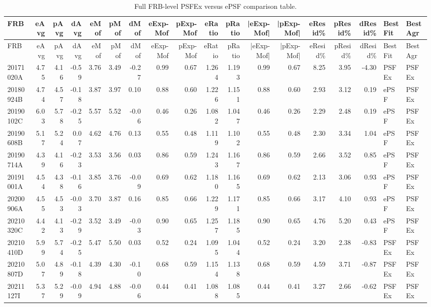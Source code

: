 \begin{longtable}{lrrrrrrrrrrrrrrrll}
\caption{Full FRB-level PSFEx versus ePSF comparison table.}\label{tab:psfex_all_frbs} \\
\hline
 FRB & eAvg & pAvg & dAvg & eMof & pMof & dMof & eExp-Mof & pExp-Mof & eRatio & pRatio & |eExp-Mof| & |pExp-Mof| & eResid\% & pResid\% & dResid\% & BestFit & BestAgr \\
\hline
\endfirsthead
\hline
 FRB & eAvg & pAvg & dAvg & eMof & pMof & dMof & eExp-Mof & pExp-Mof & eRatio & pRatio & |eExp-Mof| & |pExp-Mof| & eResid\% & pResid\% & dResid\% & BestFit & BestAgr \\
\hline
\endhead
 20171020A & 4.75 & 4.16 & -0.59 & 3.76 & 3.49 & -0.27 & 0.99 & 0.67 & 1.264 & 1.193 & 0.99 & 0.67 & 8.25 & 3.95 & -4.30 & PSFEx & PSFEx \\
 20180924B & 4.74 & 4.57 & -0.18 & 3.87 & 3.97 & 0.10 & 0.88 & 0.60 & 1.226 & 1.151 & 0.88 & 0.60 & 2.93 & 3.12 & 0.19 & ePSF & PSFEx \\
 20190102C & 6.03 & 5.78 & -0.25 & 5.57 & 5.52 & -0.06 & 0.46 & 0.26 & 1.082 & 1.047 & 0.46 & 0.26 & 2.29 & 2.48 & 0.19 & ePSF & PSFEx \\
 20190608B & 5.17 & 5.24 & 0.07 & 4.62 & 4.76 & 0.13 & 0.55 & 0.48 & 1.119 & 1.102 & 0.55 & 0.48 & 2.30 & 3.34 & 1.04 & ePSF & PSFEx \\
 20190714A & 4.39 & 4.16 & -0.23 & 3.53 & 3.56 & 0.03 & 0.86 & 0.59 & 1.243 & 1.167 & 0.86 & 0.59 & 2.66 & 3.52 & 0.85 & ePSF & PSFEx \\
 20191001A & 4.54 & 4.38 & -0.16 & 3.85 & 3.76 & -0.09 & 0.69 & 0.62 & 1.180 & 1.165 & 0.69 & 0.62 & 2.13 & 3.06 & 0.93 & ePSF & PSFEx \\
 20200906A & 4.55 & 4.53 & -0.03 & 3.70 & 3.87 & 0.16 & 0.85 & 0.66 & 1.229 & 1.171 & 0.85 & 0.66 & 3.17 & 4.10 & 0.93 & ePSF & PSFEx \\
 20210320C & 4.42 & 4.13 & -0.29 & 3.52 & 3.49 & -0.03 & 0.90 & 0.65 & 1.257 & 1.185 & 0.90 & 0.65 & 4.76 & 5.20 & 0.43 & ePSF & PSFEx \\
 20210410D & 5.99 & 5.74 & -0.25 & 5.47 & 5.50 & 0.03 & 0.52 & 0.24 & 1.095 & 1.044 & 0.52 & 0.24 & 3.20 & 2.38 & -0.83 & PSFEx & PSFEx \\
 20210807D & 5.07 & 4.89 & -0.18 & 4.39 & 4.30 & -0.10 & 0.68 & 0.59 & 1.154 & 1.138 & 0.68 & 0.59 & 4.59 & 3.71 & -0.87 & PSFEx & PSFEx \\
 20211127I & 5.37 & 5.29 & -0.09 & 4.94 & 4.88 & -0.06 & 0.44 & 0.41 & 1.088 & 1.085 & 0.44 & 0.41 & 3.27 & 2.66 & -0.62 & PSFEx & PSFEx \\

\end{longtable}
